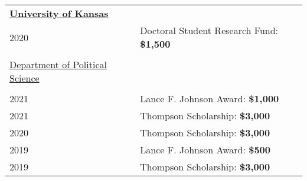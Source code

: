 \documentclass[margin,line,pifont,palatino,courier]{res}
\begin{document}
\begin{resume}
\begin{tabular}{ll}
  \textbf{\underline{University of Kansas}} &\\
  2020       & Doctoral Student Research Fund: \bf{\$1,500}\\
  \\
  \underline{Department of Political Science}&\\
  \\
  2021       & Lance F. Johnson Award: \bf{\$1,000}\\
  2021       & Thompson Scholarship: \bf{\$3,000}\\
  2020       & Thompson Scholarship: \bf{\$3,000}\\
  2019       & Lance F. Johnson Award: \bf{\$500}\\
  2019       & Thompson Scholarship: \bf{\$3,000}\\

\end{tabular}
\end{resume}
\end{document}
